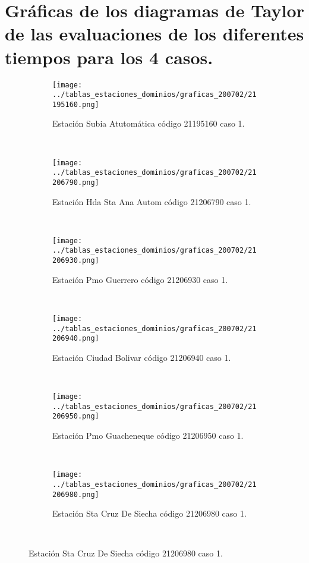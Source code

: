 \chapter{Gráficas de los diagramas de Taylor de las evaluaciones de los diferentes tiempos para los 4 casos.}
\label{anexo:graficas_taylor_tiempos_4casos}
\newpage
\begin{figure}[H]
 
 
 
\begin{subfigure}[normla]{0.4\textwidth}
\texttt{[image: ../tablas\_estaciones\_dominios/graficas\_200702/21195160.png]}
\caption{Estación Subia Atutomática código 21195160 caso 1.}
\end{subfigure}
~
\begin{subfigure}[normla]{0.4\textwidth}
\texttt{[image: ../tablas\_estaciones\_dominios/graficas\_200702/21206790.png]}
\caption{Estación Hda Sta Ana Autom código 21206790 caso 1.}
\end{subfigure}
~
\begin{subfigure}[normla]{0.4\textwidth}
\texttt{[image: ../tablas\_estaciones\_dominios/graficas\_200702/21206930.png]}
\caption{Estación Pmo Guerrero código 21206930 caso 1.}
\end{subfigure}
~
\begin{subfigure}[normla]{0.4\textwidth}
\texttt{[image: ../tablas\_estaciones\_dominios/graficas\_200702/21206940.png]}
\caption{Estación Ciudad Bolivar código 21206940 caso 1.}
\end{subfigure}
~
\begin{subfigure}[normla]{0.4\textwidth}
\texttt{[image: ../tablas\_estaciones\_dominios/graficas\_200702/21206950.png]}
\caption{Estación Pmo Guacheneque código 21206950 caso 1.}
\end{subfigure}
~
\begin{subfigure}[normla]{0.4\textwidth}
\texttt{[image: ../tablas\_estaciones\_dominios/graficas\_200702/21206980.png]}
\caption{Estación Sta Cruz De Siecha código 21206980 caso 1.}
\end{subfigure}
~
\end{figure}
 
